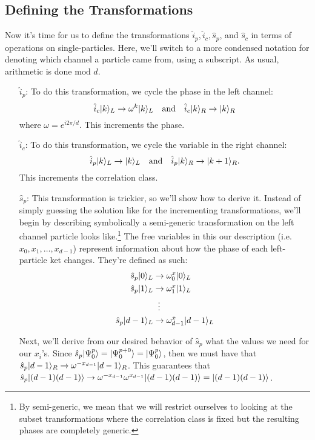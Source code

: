 \subsection{Defining the Transformations}
Now it's time for us to define the transformations $\hat{i}_p, \hat{i}_c, \hat{s}_p$, and $\hat{s}_c$ in terms of operations on single-particles. Here, we'll switch to a more condensed notation for denoting which channel a particle came from, using a subscript. As usual, arithmetic is done $\text{mod } d$. 
\begin{enumerate}
  \item[$\hat{i}_p$:] To do this transformation, we cycle the phase in the left channel:
  \[
  \hat{i}_c | k \rangle_L \rightarrow \omega^k | k \rangle_L \quad \text{and} \quad \hat{i}_c | k \rangle_R \rightarrow | k \rangle_R
  \]
  where $\omega = e^{i 2 \pi / d}$. This increments the phase.
  \item[$\hat{i}_c$:] To do this transformation, we cycle the variable in the right channel:
  \[
  \hat{i}_p | k \rangle_L \rightarrow | k \rangle_L \quad \text{and} \quad \hat{i}_p | k \rangle_R \rightarrow | k + 1 \rangle_R.
  \]
  This increments the correlation class.
  \item[$\hat{s}_p$:] This transformation is trickier, so we'll show how to derive it. Instead of simply guessing the solution like for the incrementing transformations, we'll begin by describing symbolically a semi-generic transformation on the left channel particle looks like.\footnote{By semi-generic, we mean that we will restrict ourselves to looking at the subset transformations where the correlation class is fixed but the resulting phases are completely generic.} The free variables in this our description (i.e. $x_0, x_1, \ldots, x_{d-1}$) represent information about how the phase of each left-particle ket changes. They're defined as such:
\begin{equation}
\begin{split}
    \hat{s}_p | 0 \rangle_L & \rightarrow \omega^x_0 | 0 \rangle_L \\
    \hat{s}_p | 1 \rangle_L & \rightarrow \omega^x_1 | 1 \rangle_L \\
    & \; \; \vdots \\
    \hat{s}_p | d-1 \rangle_L & \rightarrow \omega^x_{d-1}| d-1 \rangle_L
\end{split}
\end{equation}

Next, we'll derive from our desired behavior of $\hat{s}_p$ what the values we need for our $x_i$'s. Since $\hat{s}_p | \Psi_0^p \rangle = | \Psi_0^{p+0} \rangle = | \Psi_0^p \rangle$, then we must have that $\hat{s}_p | d-1 \rangle_R \rightarrow \omega^{-x_{d-1}}| d-1 \rangle_R$. This guarantees that $\hat{s}_p | (d-1)(d-1) \rangle \rightarrow \omega^{-x_{d-1}}\omega^{x_{d-1}} | (d-1)(d-1) \rangle = | (d-1)(d-1) \rangle$.


\end{enumerate}
